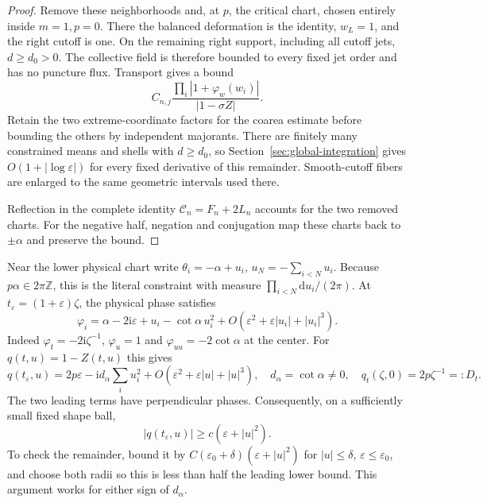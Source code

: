 \documentclass[11pt]{article}
\numberwithin{equation}{section}
\theoremstyle{remark}\newtheorem{remark}[theorem]{Remark}
\newcommand{\ii}{\mathrm i}
\newcommand{\dd}{\mathrm d}
\begin{document}
\begin{proof}
Remove these neighborhoods and, at $p$, the critical chart,
chosen entirely inside $m=1,p=0$. There the balanced deformation
is the identity, $w_L=1$, and the right cutoff is one.
On the remaining right support, including all cutoff jets,
$d\ge d_0>0$. The collective field is therefore bounded to
every fixed jet order and has no puncture flux.
Transport gives a bound
\[
 C_{n,j}\frac{\prod_i|1+\varphi_w(w_i)|}{|1-\sigma Z|}.
\]
Retain the two extreme-coordinate factors for the coarea
estimate before bounding the others by independent majorants.
There are finitely many constrained means and shells with
$d\ge d_0$, so Section~\ref{sec:global-integration} gives
$O(1+|\log\varepsilon|)$ for every fixed derivative of this
remainder. Smooth-cutoff fibers are enlarged to the same
geometric intervals used there.

Reflection in the complete identity $\mathcal C_n=F_n+2L_n$
accounts for the two removed charts. For the negative half, negation and conjugation map
these charts back to $\pm\alpha$ and preserve the bound.
\end{proof}

Near the lower physical chart write
$\theta_i=-\alpha+u_i$, $u_N=-\sum_{i<N}u_i$.
Because $p\alpha\in2\pi\mathbb Z$, this is the literal
constraint with measure $\prod_{i<N}\dd u_i/(2\pi)$.
At $t_\varepsilon=(1+\varepsilon)\zeta$, the physical phase satisfies
\[
 \varphi_i=\alpha-2\ii\varepsilon+u_i-\cot\alpha\,u_i^2
      +O(\varepsilon^2+\varepsilon|u_i|+|u_i|^3).
\]
Indeed $\varphi_t=-2\ii\zeta^{-1}$,
$\varphi_u=1$ and $\varphi_{uu}=-2\cot\alpha$ at the center.
For $q(t,u)=1-Z(t,u)$ this gives
\begin{equation}\label{eq:single-q}
 q(t_\varepsilon,u)=2p\varepsilon-\ii d_\alpha\sum_i u_i^2
       +O(\varepsilon^2+\varepsilon|u|+|u|^3),\quad
 d_\alpha=\cot\alpha\ne0,\quad
 q_t(\zeta,0)=2p\zeta^{-1}=:D_t.
\end{equation}
The two leading terms have perpendicular phases. Consequently,
on a sufficiently small fixed shape ball,
\begin{equation}\label{eq:single-q-bound}
 |q(t_\varepsilon,u)|\ge c(\varepsilon+|u|^2).
\end{equation}
To check the remainder, bound it by
$C(\varepsilon_0+\delta)(\varepsilon+|u|^2)$ for
$|u|\le\delta$, $\varepsilon\le\varepsilon_0$, and choose
both radii so this is less than half the leading lower bound.
This argument works for either sign of $d_\alpha$.
\end{document}
